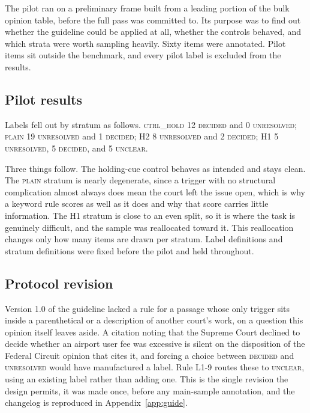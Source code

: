 The pilot ran on a preliminary frame built from a leading portion of the bulk
opinion table, before the full pass was committed to. Its purpose was to find out
whether the guideline could be applied at all, whether the controls behaved, and
which strata were worth sampling heavily. Sixty items were annotated. Pilot items
sit outside the benchmark, and every pilot label is excluded from the results.

\subsection{Pilot results} Labels fell out by stratum as follows.
\textsc{ctrl\_hold} 12 \textsc{decided} and 0 \textsc{unresolved};
\textsc{plain} 19 \textsc{unresolved} and 1 \textsc{decided};
H2 8 \textsc{unresolved} and 2 \textsc{decided};
H1 5 \textsc{unresolved}, 5 \textsc{decided}, and 5 \textsc{unclear}.

Three things follow. The holding-cue control behaves as intended and stays clean.
The \textsc{plain} stratum is nearly degenerate, since a trigger with no
structural complication almost always does mean the court left the issue open,
which is why a keyword rule scores as well as it does and why that score carries
little information. The H1 stratum is close to an even split, so it is where the
task is genuinely difficult, and the sample was reallocated toward it. This
reallocation changes only how many items are drawn per stratum. Label definitions
and stratum definitions were fixed before the pilot and held throughout.

\subsection{Protocol revision} Version 1.0 of the guideline lacked a rule for a
passage whose only trigger sits inside a parenthetical or a description of
another court's work, on a question this opinion itself leaves aside. A citation noting that the Supreme Court declined to decide whether an
airport user fee was excessive is silent on the disposition of the Federal
Circuit opinion that cites it, and forcing a choice between
\textsc{decided} and \textsc{unresolved} would have manufactured a label. Rule
L1-9 routes these to \textsc{unclear}, using an existing label rather than adding
one. This is the single revision the design permits, it was made once, before any
main-sample annotation, and the changelog is reproduced in
Appendix~\ref{app:guide}.

